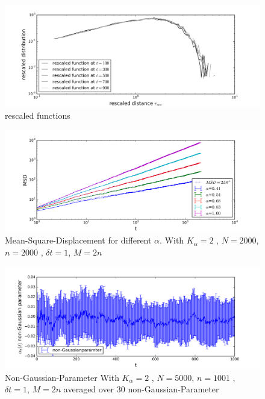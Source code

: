 \documentclass[
  a4paper,BCOR10mm,oneside,
  bibtotoc,idxtotoc,
  headsepline,footsepline,%
  fleqn,openbib
]{scrbook}
\begin{document}
\begin{figure}[h]
\includegraphics[width=\textwidth]{./data/rescaled.png}
\caption{rescaled functions}
 \centering
\end{figure}

\begin{figure}[h]
\includegraphics[width=\textwidth]{./data/alpha_change.png}
\caption{Mean-Square-Displacement for different $\alpha$. With $K_{\alpha}=2$ , $N=2000$, $n=2000$ , $\delta t = 1$, $M=2n$ }
 \centering
\end{figure}

\begin{figure}[h]
\includegraphics[width=\textwidth]{./data/nongaussian.png}
\caption{Non-Gaussian-Parameter With $K_{\alpha}=2$ , $N=5000$, $n=1001$ , $\delta t = 1$, $M=2n$ averaged over $30$ non-Gaussian-Parameter}
 \centering
\end{figure}
\end{document}
